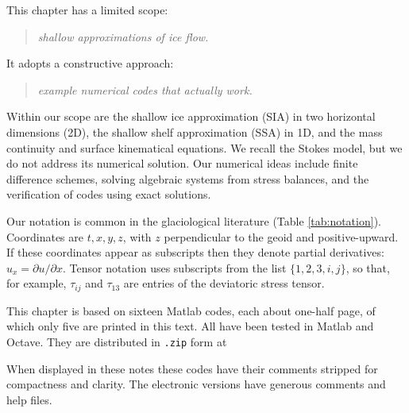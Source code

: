 \documentclass[titlepage,a4paper,final,12pt]{scrartcl}
\begin{document}
This chapter has a limited scope:
  \begin{quote}\emph{shallow approximations of ice flow.}\end{quote}
It adopts a constructive approach:
  \begin{quote}\emph{example numerical codes that actually work.}\end{quote}
Within our scope are the shallow ice approximation (SIA) in two horizontal dimensions (2D), the shallow shelf approximation (SSA) in 1D, and the mass continuity and surface kinematical equations.  We recall the Stokes model, but we do not address its numerical solution.  Our numerical ideas include finite difference schemes, solving algebraic systems from stress balances, and the verification of codes using exact solutions.

Our notation is common in the glaciological literature (Table \ref{tab:notation}).  Coordinates are $t,x,y,z$, with $z$ perpendicular to the geoid and positive-upward.  If these coordinates appear as subscripts then they denote partial derivatives: $u_x = \partial u/\partial x$.  Tensor notation uses subscripts from the list $\{1,2,3,i,j\}$, so that, for example, $\tau_{ij}$ and $\tau_{13}$ are entries of the deviatoric stress tensor.

This chapter is based on sixteen Matlab codes, each about one-half page, of which only five are printed in this text.  All have been tested in Matlab and Octave.  They are distributed in \texttt{.zip} form at
\begin{quote}
\end{quote}
\noindent When displayed in these notes these codes have their comments stripped for compactness and clarity.  The electronic versions have generous comments and help files.
\end{document}
